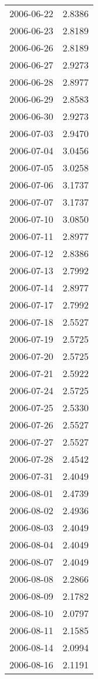 \begin{tabular}{lr}
2006-06-22 &      2.8386 \\
2006-06-23 &      2.8189 \\
2006-06-26 &      2.8189 \\
2006-06-27 &      2.9273 \\
2006-06-28 &      2.8977 \\
2006-06-29 &      2.8583 \\
2006-06-30 &      2.9273 \\
2006-07-03 &      2.9470 \\
2006-07-04 &      3.0456 \\
2006-07-05 &      3.0258 \\
2006-07-06 &      3.1737 \\
2006-07-07 &      3.1737 \\
2006-07-10 &      3.0850 \\
2006-07-11 &      2.8977 \\
2006-07-12 &      2.8386 \\
2006-07-13 &      2.7992 \\
2006-07-14 &      2.8977 \\
2006-07-17 &      2.7992 \\
2006-07-18 &      2.5527 \\
2006-07-19 &      2.5725 \\
2006-07-20 &      2.5725 \\
2006-07-21 &      2.5922 \\
2006-07-24 &      2.5725 \\
2006-07-25 &      2.5330 \\
2006-07-26 &      2.5527 \\
2006-07-27 &      2.5527 \\
2006-07-28 &      2.4542 \\
2006-07-31 &      2.4049 \\
2006-08-01 &      2.4739 \\
2006-08-02 &      2.4936 \\
2006-08-03 &      2.4049 \\
2006-08-04 &      2.4049 \\
2006-08-07 &      2.4049 \\
2006-08-08 &      2.2866 \\
2006-08-09 &      2.1782 \\
2006-08-10 &      2.0797 \\
2006-08-11 &      2.1585 \\
2006-08-14 &      2.0994 \\
2006-08-16 &      2.1191 \\

\end{tabular}
